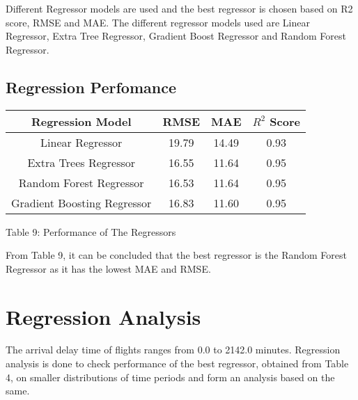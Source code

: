 \documentclass[12pt,letter-paper]{article}
\begin{document}
        Different Regressor models are used and the best regressor is chosen based on R2 score, RMSE and MAE. The different regressor models used are Linear Regressor, Extra Tree Regressor, Gradient Boost Regressor and Random Forest Regressor.
     
    \subsection{Regression Perfomance}
    
        \begin{table}[H]
            \begin{center}
                \begin{tabular}{ |c|c|c|c| } 
                    \hline
                    Regression Model & RMSE & MAE & $R^2$ Score\\ 
                    \hline
                    Linear Regressor & 19.79 & 14.49 & 0.93\\ 
                    \hline
                    Extra Trees Regressor & 16.55 & 11.64 & 0.95\\ 
                    \hline
                    Random Forest Regressor & 16.53 & 11.64 & 0.95\\ 
                    \hline
                    Gradient Boosting Regressor & 16.83 & 11.60 & 0.95\\ 
                    \hline
                \end{tabular}
            \end{center}
            \begin{center}
                Table 9: Performance of The Regressors
            \end{center}
        \end{table}
        
    From Table 9, it can be concluded that the best regressor is the Random Forest Regressor as it has the lowest MAE and RMSE.
    
\section{Regression Analysis}

    The arrival delay time of flights ranges from 0.0 to 2142.0 minutes. Regression analysis is done to check performance of the best regressor, obtained from Table 4, on smaller distributions of time periods and form an analysis based on the same.
    
\end{document}
